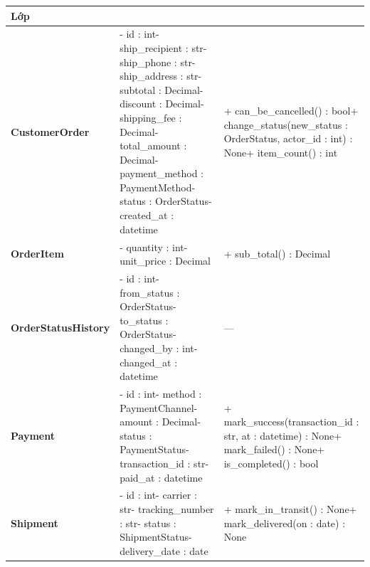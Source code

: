 \documentclass[12pt,a4paper,oneside]{report}
\begin{document}
\begin{longtable}{>{\raggedright\arraybackslash\small\bfseries}p{3.5cm}>{\raggedright\arraybackslash\ttfamily\footnotesize}p{5.1cm}>{\raggedright\arraybackslash\ttfamily\footnotesize}p{6.7cm}}
\toprule
\textbf{Lớp} & \multicolumn{1}{l}{\textbf{Thuộc tính}} & \multicolumn{1}{l}{\textbf{Phương thức}} \\
\midrule
\endhead
\bottomrule
\endlastfoot
CustomerOrder & - id : int\newline - ship\_recipient : str\newline - ship\_phone : str\newline - ship\_address : str\newline - subtotal : Decimal\newline - discount : Decimal\newline - shipping\_fee : Decimal\newline - total\_amount : Decimal\newline - payment\_method : PaymentMethod\newline - status : OrderStatus\newline - created\_at : datetime & + can\_be\_cancelled() : bool\newline + change\_status(new\_status : OrderStatus, actor\_id : int) : None\newline + item\_count() : int \\
\midrule
OrderItem & - quantity : int\newline - unit\_price : Decimal & + sub\_total() : Decimal \\
\midrule
OrderStatusHistory & - id : int\newline - from\_status : OrderStatus\newline - to\_status : OrderStatus\newline - changed\_by : int\newline - changed\_at : datetime & --- \\
\midrule
Payment & - id : int\newline - method : PaymentChannel\newline - amount : Decimal\newline - status : PaymentStatus\newline - transaction\_id : str\newline - paid\_at : datetime & + mark\_success(transaction\_id : str, at : datetime) : None\newline + mark\_failed() : None\newline + is\_completed() : bool \\
\midrule
Shipment & - id : int\newline - carrier : str\newline - tracking\_number : str\newline - status : ShipmentStatus\newline - delivery\_date : date & + mark\_in\_transit() : None\newline + mark\_delivered(on : date) : None \\
\midrule
\end{longtable}
\end{document}
